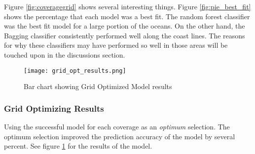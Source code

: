 \par
Figure \ref{fig:coveragegrid} shows several interesting things.
Figure \ref{fig:pie_best_fit} shows the percentage that each model was a best fit.
The random forest classifier was the best fit model for a large portion of the oceans.
On the other hand, the Bagging classifier consistently performed well along the coast lines.
The reasons for why these classifiers may have performed so well in those areas will be touched upon in the discussions section.


\begin{figure}[h]
    \centering
    \texttt{[image: grid\_opt\_results.png]}
    \caption{Bar chart showing Grid Optimized Model results}
    \label{fig:grid_opt_barplot}
\end{figure}
\subsubsection{Grid Optimizing Results}
Using the successful model for each coverage as an \textit{optimum} selection.
The optimum selection improved the prediction accuracy of the model by several percent.
See figure \ref{fig:grid_opt_barplot} for the results of the model.



